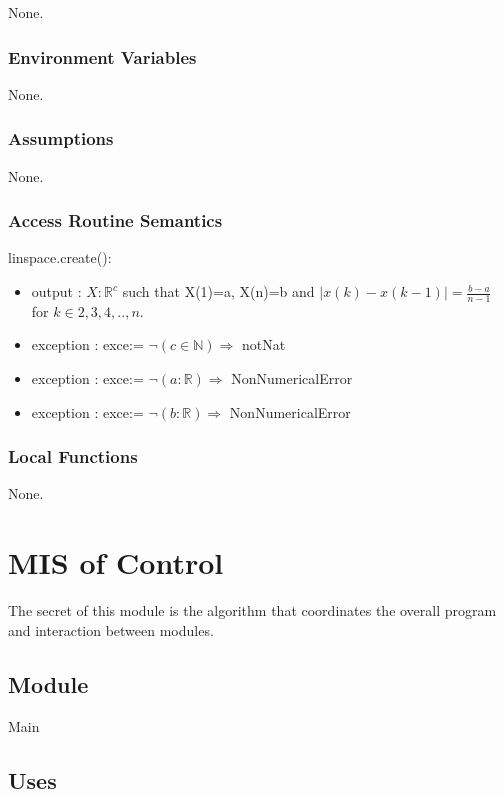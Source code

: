 \documentclass[12pt, titlepage]{article}
\begin{document}
None.

\subsubsection{Environment Variables}

None.

\subsubsection{Assumptions}

None.

\subsubsection{Access Routine Semantics}

\noindent linspace.create():
\begin{itemize}
	\item output : $X : \mathbb{R}^{c}$ such that X(1)=a, X(n)=b and 
	$|x(k)-x(k-1)|=\frac{b-a}{n-1}$ for $k \in {2,3,4,..,n}$. 
	\item exception : exce:= $\neg(c \in \mathbb{N}) \Rightarrow$ 
	notNat
	\item exception : exce:= $\neg(a: \mathbb{R}) \Rightarrow$ 
	NonNumericalError 
	\item exception : exce:= $\neg(b: \mathbb{R}) \Rightarrow$ NonNumericalError
\end{itemize}

\subsubsection{Local Functions} 

None. 

\newpage 

\section{MIS of Control} \label{MCON}

The secret of this module is the algorithm that coordinates the overall program 
and 
interaction between modules.

\subsection{Module}

Main

\subsection{Uses}
\end{document}
